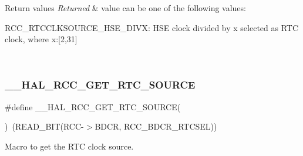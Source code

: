 \begin{DoxyRetVals}{Return values}
{\em Returned} & value can be one of the following values\+: \begin{DoxyItemize}
\item R\+C\+C\+\_\+\+R\+T\+C\+C\+L\+K\+S\+O\+U\+R\+C\+E\+\_\+\+H\+S\+E\+\_\+\+D\+I\+V\+X\+: H\+SE clock divided by x selected as R\+TC clock, where x\+:\mbox{[}2,31\mbox{]} \end{DoxyItemize}
\\
\hline
\end{DoxyRetVals}
\mbox{\label{group___r_c_c___internal___r_t_c___clock___configuration_gad40d00ff1c984ebd011ea9f6e7f93c44}} 
\subsubsection{\texorpdfstring{\_\_HAL\_RCC\_GET\_RTC\_SOURCE}{\_\_HAL\_RCC\_GET\_RTC\_SOURCE}}
{\footnotesize\ttfamily \#define \+\_\+\+\_\+\+H\+A\+L\+\_\+\+R\+C\+C\+\_\+\+G\+E\+T\+\_\+\+R\+T\+C\+\_\+\+S\+O\+U\+R\+CE(\begin{DoxyParamCaption}{ }\end{DoxyParamCaption})~(R\+E\+A\+D\+\_\+\+B\+IT(R\+CC-\/$>$B\+D\+CR, R\+C\+C\+\_\+\+B\+D\+C\+R\+\_\+\+R\+T\+C\+S\+EL))}



Macro to get the R\+TC clock source. 


